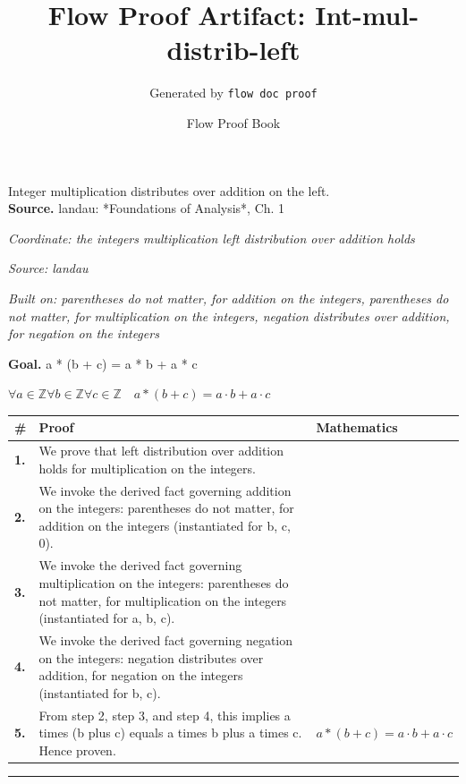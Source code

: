 \documentclass[11pt]{article}
\title{Flow Proof Artifact: Int-mul-distrib-left}
\author{Generated by \texttt{flow doc proof}}
\date{Flow Proof Book}
\theoremstyle{definition}
\begin{document}
\maketitle
Integer multiplication distributes over addition on the left.\\[0.5em]
\textbf{Source.} landau: *Foundations of Analysis*, Ch. 1\\[0.5em]
\bigskip
{}\par
\smallskip\noindent\textit{Coordinate: the integers \cdot multiplication \cdot left distribution over addition holds}\par
\smallskip\noindent\textit{Source: landau}\par
\smallskip\noindent\textit{Built on: parentheses do not matter, for addition on the integers, parentheses do not matter, for multiplication on the integers, negation distributes over addition, for negation on the integers}\par
\medskip
\noindent\textbf{Goal.} a * (b + c) = a * b + a * c\par
\noindent$\displaystyle \forall a \in \mathbb{Z} \forall b \in \mathbb{Z} \forall c \in \mathbb{Z}\quad a * (b + c) = a \cdot b + a \cdot c$\par
\medskip
\noindent
\begin{tabular}{@{} >{\raggedright\arraybackslash}p{} >{\raggedright\arraybackslash}p{} >{\raggedleft\arraybackslash}p{} @{}}
\textbf{\#} & \textbf{Proof} & \textbf{Mathematics} \\
\midrule
\textbf{1.} & We prove that left distribution over addition holds for multiplication on the integers. & \\[0.45em]
\textbf{2.} & We invoke the derived fact governing addition on the integers: parentheses do not matter, for addition on the integers (instantiated for b, c, 0). & \\[0.45em]
\textbf{3.} & We invoke the derived fact governing multiplication on the integers: parentheses do not matter, for multiplication on the integers (instantiated for a, b, c). & \\[0.45em]
\textbf{4.} & We invoke the derived fact governing negation on the integers: negation distributes over addition, for negation on the integers (instantiated for b, c). & \\[0.45em]
\textbf{5.} & From step 2, step 3, and step 4, this implies a times (b plus c) equals a times b plus a times c. Hence proven. & $\displaystyle a * (b + c) = a \cdot b + a \cdot c$ \\[0.45em]
\bottomrule
\end{tabular}
\label{thm:Int-multiplication-left_distribution_over_addition_holds}
\par\medskip\hrule
\end{document}
